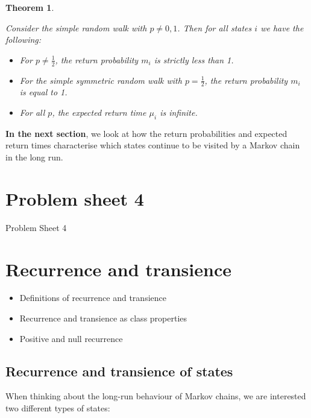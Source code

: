 \documentclass[
  a4paper,
]{article}
\providecommand{\tightlist}{%
  \setlength{\itemsep}{0pt}\setlength{\parskip}{0pt}}
\newtheorem{theorem}{Theorem}[section]
\theoremstyle{definition}
\theoremstyle{definition}
\theoremstyle{definition}
\theoremstyle{remark}
\begin{document}
\begin{theorem}
\protect\hypertarget{thm:rw-summary}{}\label{thm:rw-summary}

Consider the simple random walk with \(p \neq 0,1\). Then for all states \(i\) we have the following:

\begin{itemize}
\tightlist
\item
  For \(p \neq \frac12\), the return probability \(m_i\) is strictly less than 1.
\item
  For the simple symmetric random walk with \(p = \frac12\), the return probability \(m_i\) is equal to 1.
\item
  For all \(p\), the expected return time \(\mu_i\) is infinite.
\end{itemize}

\end{theorem}

\textbf{In the next section}, we look at how the return probabilities and expected return times characterise which states continue to be visited by a Markov chain in the long run.

\hypertarget{P04}{%
\section*{Problem sheet 4}\label{P04}}

Problem Sheet 4

\hypertarget{S09-recurrence-transience}{%
\section{Recurrence and transience}\label{S09-recurrence-transience}}

\begin{itemize}
\tightlist
\item
  Definitions of recurrence and transience
\item
  Recurrence and transience as class properties
\item
  Positive and null recurrence
\end{itemize}

\hypertarget{rec-trans-def}{%
\subsection{Recurrence and transience of states}\label{rec-trans-def}}

When thinking about the long-run behaviour of Markov chains, we are interested two different types of states:
\end{document}
